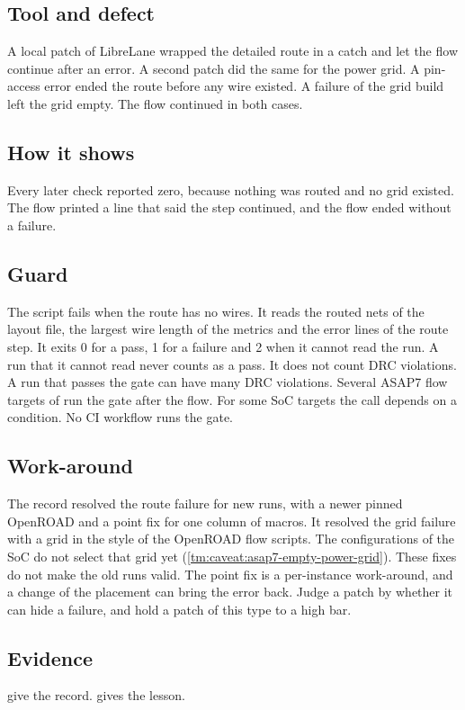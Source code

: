 \subsection*{Tool and defect}
A local patch of LibreLane wrapped the detailed route in a catch and let the flow continue after an error. A second patch did the same for the power grid. A pin-access error ended the route before any wire existed. A failure of the grid build left the grid empty. The flow continued in both cases.

\subsection*{How it shows}
Every later check reported zero, because nothing was routed and no grid existed. The flow printed a line that said the step continued, and the flow ended without a failure.

\subsection*{Guard}
The script  fails when the route has no wires. It reads the routed nets of the layout file, the largest wire length of the metrics and the error lines of the route step. It exits 0 for a pass, 1 for a failure and 2 when it cannot read the run. A run that it cannot read never counts as a pass. It does not count DRC violations. A run that passes the gate can have many DRC violations. Several ASAP7 flow targets of  run the gate after the flow. For some SoC targets the call depends on a condition. No CI workflow runs the gate.

\subsection*{Work-around}
The record resolved the route failure for new runs, with a newer pinned OpenROAD and a point fix for one column of macros. It resolved the grid failure with a grid in the style of the OpenROAD flow scripts. The configurations of the SoC do not select that grid yet (\cref{tm:caveat:asap7-empty-power-grid}). These fixes do not make the old runs valid. The point fix is a per-instance work-around, and a change of the placement can bring the error back. Judge a patch by whether it can hide a failure, and hold a patch of this type to a high bar.

\subsection*{Evidence}
 give the record.  gives the lesson.

